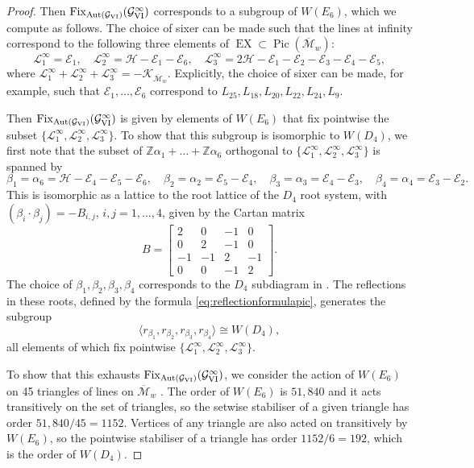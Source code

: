 \documentclass[a4paper,reqno]{amsart}
\numberwithin{equation}{section}
\newcommand{\Z}{\mathbb{Z}}
\newcommand{\E}{\mathcal{E}}
\newcommand{\h}{\mathcal{H}}
\newcommand{\Pic}{\operatorname{Pic}}
\numberwithin{equation}{section}
\begin{document}
\begin{proof}
    Then $\operatorname{Fix}_{\operatorname{Aut}(\mathcal{G}_{\rm{VI}})}(\mathcal{G}_{\rm{VI}}^\infty)$ corresponds to a subgroup of $W(E_6)$, which we compute as follows. 
    The choice of sixer can be made such that the lines at infinity correspond to the following three elements of $\operatorname{EX}\subset \Pic(\overline{\mathcal{M}}_w)$:
    $$ \mathcal{L}^{\infty}_{1} =  \E_1, \quad \mathcal{L}^{\infty}_{2} = \h - \E_1-\E_6, \quad \mathcal{L}^{\infty}_{3} = 2\h - \E_1-\E_2-\E_3-\E_4-\E_5,$$
    where $\mathcal{L}^{\infty}_{1}+\mathcal{L}^{\infty}_{2}+\mathcal{L}^{\infty}_{3}=-\mathcal{K}_{\overline{\mathcal{M}}_w}$. 
    Explicitly, the choice of sixer can be made, for example, such that $\E_1,\dots,\E_6$ correspond to $L_{25}, L_{18},L_{20},L_{22},L_{24},L_9$.
    
    Then $\operatorname{Fix}_{\operatorname{Aut}(\mathcal{G}_{\rm{VI}})}(\mathcal{G}_{\rm{VI}}^\infty)$ is given by elements of $W(E_6)$ that fix pointwise the subset $\{\mathcal{L}^{\infty}_{1},\mathcal{L}^{\infty}_{2},\mathcal{L}^{\infty}_{3}\}$.
    To show that this subgroup is isomorphic to $W(D_4)$, we first note that the subset of $\Z \alpha_1 + \dots + \Z \alpha_6$ orthogonal to $\{\mathcal{L}^{\infty}_{1},\mathcal{L}^{\infty}_{2},\mathcal{L}^{\infty}_{3}\}$ is spanned by     
    $$\beta_1 = \alpha_6=\h-\E_4-\E_5-\E_6, \quad \beta_2 =\alpha_2=\E_5-\E_4, \quad \beta_3 =\alpha_3=\E_4-\E_3, \quad \beta_4=\alpha_4= \E_3-\E_2.$$
    This is isomorphic as a lattice to the root lattice of the $D_4$ root system, with $(\beta_i\cdot\beta_j)=-B_{i,j}$, $i,j=1,\dots,4$, given by the Cartan matrix  
    $$ B = \begin{bmatrix}
 2 & 0 & -1 & 0 \\
 0 & 2 & -1 & 0 \\
 -1 & -1 & 2 & -1 \\
 0 & 0 & -1 & 2 
    \end{bmatrix}.$$
    The choice of $\beta_1,\beta_2,\beta_3,\beta_4$ corresponds to the $D_4$ subdiagram in .
    The reflections in these roots, defined by the formula \eqref{eq:reflectionformulapic}, generates the subgroup
    $$\langle r_{\beta_1},r_{\beta_2},r_{\beta_3},r_{\beta_4}\rangle \cong W(D_4),$$
    all elements of which fix pointwise $\{\mathcal{L}^{\infty}_{1},\mathcal{L}^{\infty}_{2},\mathcal{L}^{\infty}_{3}\}$.

To show that this exhausts $\operatorname{Fix}_{\operatorname{Aut}(\mathcal{G}_{\rm{VI}})}(\mathcal{G}_{\rm{VI}}^\infty)$, we consider the action of $W(E_6)$ on 45 triangles of lines on $\overline{\mathcal{M}}_w$ \cite{dolgachevclassicalAG}.
The order of $W(E_6)$ is $51,840$ and it acts transitively on the set of triangles, so the setwise stabiliser of a given triangle has order $51,840/45 =1152$. 
Vertices of any triangle are also acted on transitively by $W(E_6)$, so the pointwise stabiliser of a triangle has order $1152/6=192$, which is the order of $W(D_4)$.

\end{proof}
\end{document}
